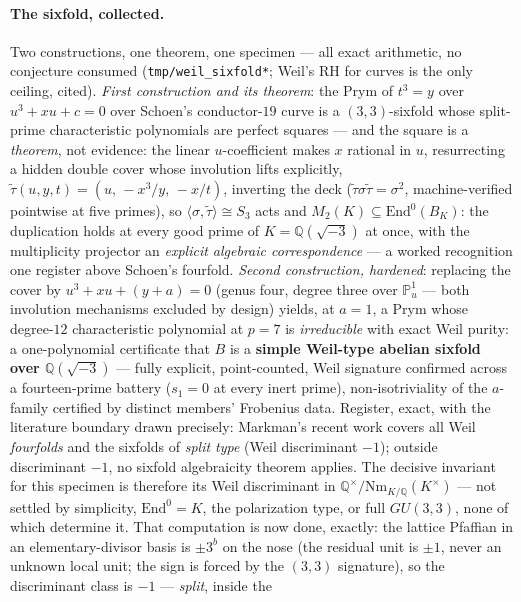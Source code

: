 \documentclass[11pt]{article}
\theoremstyle{definition}
\theoremstyle{remark}
\begin{document}
\paragraph{The sixfold, collected.} Two constructions, one theorem, one
specimen --- all exact arithmetic, no conjecture consumed
(\texttt{tmp/weil\_sixfold*}; Weil's RH for curves is the only ceiling,
cited). \emph{First construction and its theorem}: the Prym of $t^3=y$ over
$u^3+xu+c=0$ over Schoen's conductor-$19$ curve is a $(3,3)$-sixfold whose
split-prime characteristic polynomials are perfect squares --- and the square
is a \emph{theorem}, not evidence: the linear $u$-coefficient makes $x$
rational in $u$, resurrecting a hidden double cover whose involution lifts
explicitly, $\tilde\tau(u,y,t)=(u,\,-x^3/y,\,-x/t)$, inverting the deck
($\tilde\tau\sigma\tilde\tau=\sigma^2$, machine-verified pointwise at five
primes), so $\langle\sigma,\tilde\tau\rangle\cong S_3$ acts and
$M_2(K)\subseteq\mathrm{End}^0(B_K)$: the duplication holds at every good
prime of $K=\mathbb Q(\sqrt{-3})$ at once, with the multiplicity projector an
\emph{explicit algebraic correspondence} --- a worked recognition one register
above Schoen's fourfold. \emph{Second construction, hardened}: replacing the
cover by $u^3+xu+(y+a)=0$ (genus four, degree three over $\mathbb P^1_u$ ---
both involution mechanisms excluded by design) yields, at $a=1$, a Prym whose
degree-$12$ characteristic polynomial at $p=7$ is \emph{irreducible} with
exact Weil purity: a one-polynomial certificate that $B$ is a \textbf{simple
Weil-type abelian sixfold over $\mathbb Q(\sqrt{-3})$} --- fully explicit,
point-counted, Weil signature confirmed across a fourteen-prime battery
($s_1=0$ at every inert prime), non-isotriviality of the $a$-family certified
by distinct members' Frobenius data. Register, exact, with the literature
boundary drawn precisely: Markman's recent work covers all Weil
\emph{fourfolds} and the sixfolds of \emph{split type} (Weil discriminant
$-1$); outside discriminant $-1$, no sixfold algebraicity theorem applies.
The decisive invariant for this specimen is therefore its Weil discriminant
in $\mathbb Q^\times/\mathrm{Nm}_{K/\mathbb Q}(K^\times)$ --- not settled by
simplicity, $\mathrm{End}^0=K$, the polarization type, or full $GU(3,3)$,
none of which determine it. That computation is now done, exactly: the lattice Pfaffian
in an elementary-divisor basis is $\pm 3^{b}$ on the nose (the residual unit
is $\pm1$, never an unknown local unit; the sign is forced by the $(3,3)$
signature), so the discriminant class is $-1$ --- \emph{split}, inside the
\end{document}
